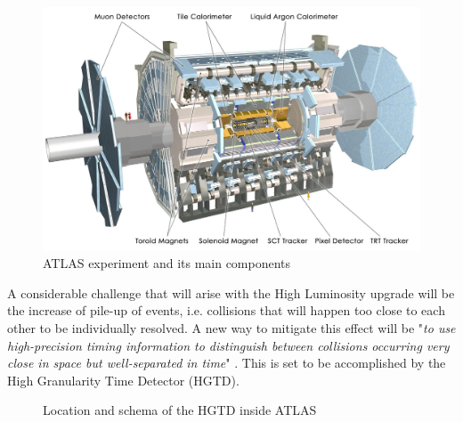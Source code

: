 \begin{figure}[!h]
    \centering
    \includegraphics[width=\textwidth]{Images/intro/ATLAS_with_description.jpg}
    \caption{ATLAS experiment and its main components}
    \label{fig:ATLAS}
\end{figure}

A considerable challenge that will arise with the High Luminosity upgrade will be the increase of pile-up of events, i.e. collisions that will happen too close to each other to be individually resolved. 
A new way to mitigate this effect will be "\textit{to use high-precision timing information to distinguish between collisions occurring very close in space but well-separated in time}" \cite{CERN-LHCC-2020-007}. This is set to be accomplished by the High Granularity Time Detector (HGTD).

\begin{figure}
    \centering
    \hfill
    \centering
    \caption{Location and schema of the HGTD inside ATLAS}
\end{figure}

